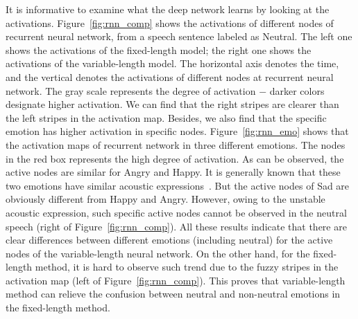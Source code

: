 \documentclass[a4paper]{article}
\begin{document}
It is informative to examine what the deep network learns by looking at the activations. Figure~\ref{fig:rnn_comp} shows the activations of different nodes of recurrent neural network, from a speech sentence labeled as Neutral. The left one shows the activations of the fixed-length model; the right one shows the activations of the variable-length model. The horizontal axis denotes the time, and the vertical denotes the activations of different nodes at recurrent neural network. The gray scale represents the degree of activation $-$ darker colors designate higher activation. We can find that the right stripes are clearer than the left stripes in the activation map. Besides, we also find that the specific emotion has higher activation in specific nodes. Figure~\ref{fig:rnn_emo} shows that the activation maps of recurrent network in three different emotions. The nodes in the red box represents the high degree of activation. As can be observed, the active nodes are similar for Angry and Happy. It is generally known that these two emotions have similar acoustic expressions~\cite{ma2017}. But the active nodes of Sad are obviously different from Happy and Angry. However, owing to the unstable acoustic expression, such specific active nodes cannot be observed in the neutral speech (right of Figure~\ref{fig:rnn_comp}). All these results indicate that there are clear differences between different emotions (including neutral) for the active nodes of the variable-length neural network.  On the other hand, for the fixed-length method, it is hard to observe such trend due to the fuzzy stripes in the activation map (left of Figure~\ref{fig:rnn_comp}). This proves that variable-length method can relieve the confusion between neutral and non-neutral emotions in the fixed-length method.
\end{document}
